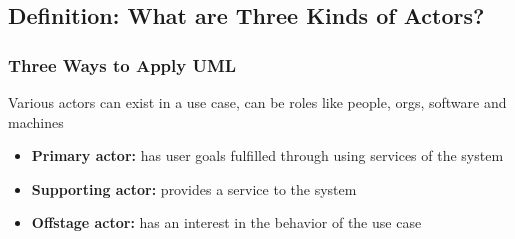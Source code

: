 \documentclass{beamer}
\begin{document}
\subsection{Definition: What are Three Kinds of Actors?}
\begin{frame}
	\frametitle{Three Ways to Apply UML}
	Various actors can exist in a use case, can be roles like people, orgs, software and machines 
	\begin{itemize}
		\item<+-> \textbf{Primary actor:} has user goals fulfilled through using services of the system 
		\item<+-> \textbf{Supporting actor:} provides a service to the system
		\item<+-> \textbf{Offstage actor:} has an interest in the behavior of the use case
    \end{itemize}
\end{frame}
\end{document}
